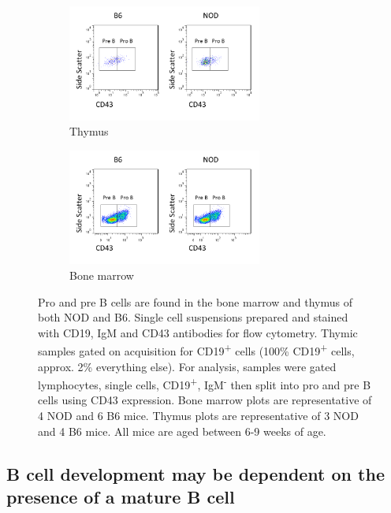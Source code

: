 \begin{figure}	
	\begin{subfigure}{\textwidth}
	\centering
	\includegraphics[width=0.7\textwidth]{Figures/Thymuspropre.png}
	\caption{Thymus}
	\label{subfig:Thypropre}
	\end{subfigure}
	\begin{subfigure}{\textwidth}
	\centering
	\includegraphics[width=0.7\textwidth]{Figures/Bonemarrowpropre.png}
	\caption{Bone marrow}
	\label{subfig:BMpropre}
	\end{subfigure}
\caption[Pro and pre B cells are present in NOD and B6 thymi]{Pro and pre B cells are found in the bone marrow and thymus of both NOD and B6. Single cell suspensions prepared and stained with CD19, IgM and CD43 antibodies for flow cytometry. Thymic samples gated on acquisition for CD19\textsuperscript{+} cells (100\% CD19\textsuperscript{+} cells, approx. 2\% everything else). For analysis, samples were gated lymphocytes, single cells, CD19\textsuperscript{+}, IgM\textsuperscript{-} then split into pro and pre B cells using CD43 expression. Bone marrow plots are representative of 4 NOD and 6 B6 mice. Thymus plots are representative of 3 NOD and 4 B6 mice. All mice are aged between 6-9 weeks of age.}
\label{fig:PropreBcells}
\end{figure}





\subsection{B cell development may be dependent on the presence of a mature B cell}

